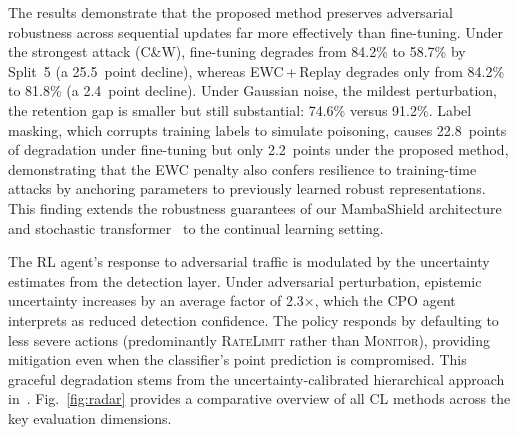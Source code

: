 \documentclass[journal]{IEEEtran}
\theoremstyle{definition}
\theoremstyle{remark}
\begin{document}
The results demonstrate that the proposed method preserves adversarial robustness across sequential updates far more effectively than fine-tuning. Under the strongest attack (C\&W), fine-tuning degrades from 84.2\% to 58.7\% by Split~5 (a 25.5~point decline), whereas EWC\,+\,Replay degrades only from 84.2\% to 81.8\% (a 2.4~point decline). Under Gaussian noise, the mildest perturbation, the retention gap is smaller but still substantial: 74.6\% versus 91.2\%. Label masking, which corrupts training labels to simulate poisoning, causes 22.8~points of degradation under fine-tuning but only 2.2~points under the proposed method, demonstrating that the EWC penalty also confers resilience to training-time attacks by anchoring parameters to previously learned robust representations. This finding extends the robustness guarantees of our MambaShield architecture~\cite{anaedevha2026mambashield} and stochastic transformer~\cite{anaedevha2026stochastic} to the continual learning setting.

The RL agent's response to adversarial traffic is modulated by the uncertainty estimates from the detection layer. Under adversarial perturbation, epistemic uncertainty increases by an average factor of 2.3$\times$, which the CPO agent interprets as reduced detection confidence. The policy responds by defaulting to less severe actions (predominantly \textsc{RateLimit} rather than \textsc{Monitor}), providing mitigation even when the classifier's point prediction is compromised. This graceful degradation stems from the uncertainty-calibrated hierarchical approach in~\cite{anaedevha2026gp}. Fig.~\ref{fig:radar} provides a comparative overview of all CL methods across the key evaluation dimensions.
\end{document}
